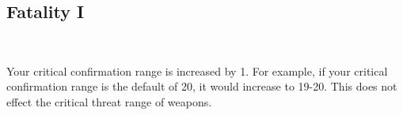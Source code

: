 \subsection*{Fatality I}\label{feat:fatality1}
 \\

Your critical confirmation range is increased by 1. For example, if your
critical confirmation range is the default of 20, it would increase to 19-20.
This does not effect the critical threat range of weapons.
